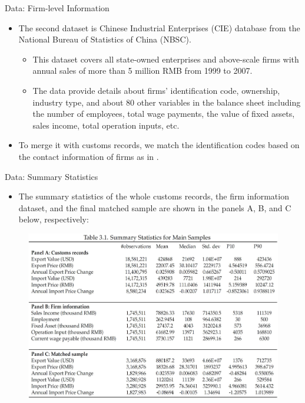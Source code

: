 \documentclass[10pt]{beamer}
\begin{document}
\begin{frame}{Data: Firm-level Information}
	\begin{itemize}
		\item The second dataset is Chinese Industrial Enterprises (CIE) database from the National Bureau of Statistics of China (NBSC).
		\begin{itemize}
			\item This dataset covers all state-owned enterprises and above-scale firms
			with annual sales of more than 5 million RMB from 1999 to 2007.
			\item The data provide details about firms’ identification code, ownership, industry
			type, and about 80 other variables in the balance sheet including the number of employees, total wage payments, the value of fixed assets, sales income, total operation inputs, etc.
		\end{itemize}
		\item To merge it with customs records, we match the identification codes based on the contact information of firms as in \cite{fan-li-yeaple2015}.
	\end{itemize}
\end{frame}

\begin{frame}{Data: Summary Statistics}
	\begin{itemize}
		\item The summary statistics of the whole customs records, the firm information dataset, and the final matched sample are shown in the panels A, B, and C below, respectively:
	\end{itemize}
	\begin{figure}[htbp]
		\centering
		\includegraphics[height=0.65\textheight]{Table3.1.jpg}
		\label{tab3.1}
	\end{figure}
\end{frame}
\end{document}
